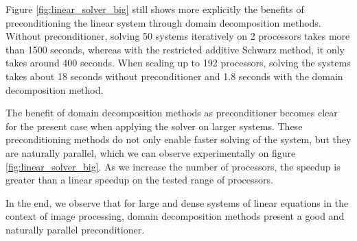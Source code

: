 Figure \ref{fig:linear_solver_big} still shows more explicitly the benefits of preconditioning the linear system through domain decomposition methods.
Without preconditioner, solving 50 systems iteratively on 2 processors takes more than 1500 seconds, whereas with the restricted additive Schwarz method, it only takes around 400 seconds.
When scaling up to 192 processors, solving the systems takes about 18 seconds without preconditioner and 1.8 seconds with the domain decomposition method.

The benefit of domain decomposition methods as preconditioner becomes clear for the present case when applying the solver on larger systems.
These preconditioning methods do not only enable faster solving of the system, but they are naturally parallel, which we can observe experimentally on figure \ref{fig:linear_solver_big}.
As we increase the number of processors, the speedup is greater than a linear speedup on the tested range of processors.

In the end, we observe that for large and dense systems of linear equations in the context of image processing, domain decomposition methods present a good and naturally parallel preconditioner.
